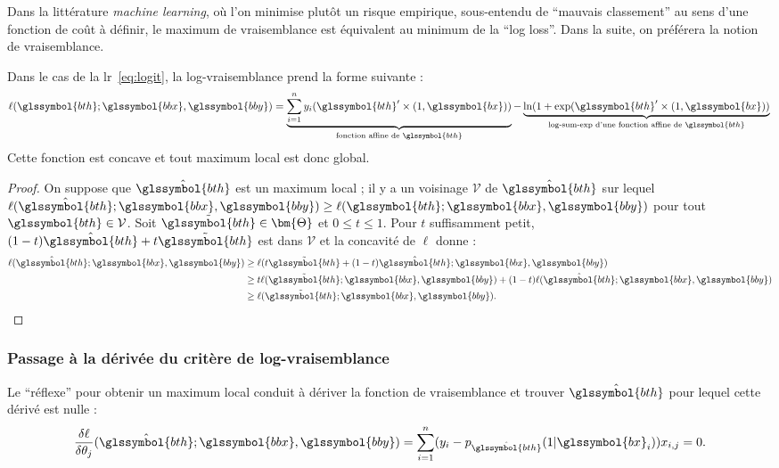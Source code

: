 Dans la littérature \textit{machine learning}, où l'on minimise plutôt un risque empirique, sous-entendu de ``mauvais classement'' au sens d'une fonction de coût à définir, le maximum de vraisemblance est équivalent au minimum de la ``log loss''. Dans la suite, on préférera la notion de vraisemblance.

Dans le cas de la \gls{lr}~\eqref{eq:logit}, la log-vraisemblance prend la forme suivante :
\[ \ell(\glssymbol{bth};\glssymbol{bbx},\glssymbol{bby}) = \underbrace{\sum_{i=1}^n y_i (\glssymbol{bth}' \times (1,\glssymbol{bx}))}_{\text{fonction affine de } \glssymbol{bth}} - \underbrace{\ln(1 + \exp(\glssymbol{bth}' \times (1,\glssymbol{bx}))}_{\text{log-sum-exp d'une fonction affine de } \glssymbol{bth}} \qedhere \]
Cette fonction est concave et tout maximum local est donc global. 
\begin{proof}
On suppose que $\hat{\glssymbol{bth}}$ est un maximum local ; il y a un voisinage $\mathcal{V}$ de $\hat{\glssymbol{bth}}$ sur lequel $\ell(\hat{\glssymbol{bth}};\glssymbol{bbx},\glssymbol{bby}) \geq \ell(\glssymbol{bth};\glssymbol{bbx},\glssymbol{bby})$ pour tout $\glssymbol{bth} \in \mathcal{V}$. Soit $\tilde{\glssymbol{bth}} \in \bm{\Theta}$ et $0 \leq t \leq 1$. Pour $t$ suffisamment petit, $(1-t)\hat{\glssymbol{bth}} + t \tilde{\glssymbol{bth}}$ est dans $\mathcal{V}$ et la concavité de $\ell$ donne :
\begin{align*}
\ell(\hat{\glssymbol{bth}};\glssymbol{bbx},\glssymbol{bby}) & \geq \ell(t \tilde{\glssymbol{bth}} + (1-t)\hat{\glssymbol{bth}};\glssymbol{bbx},\glssymbol{bby}) \\
& \geq t \ell(\tilde{\glssymbol{bth}};\glssymbol{bbx},\glssymbol{bby}) + (1-t) \ell(\hat{\glssymbol{bth}};\glssymbol{bbx},\glssymbol{bby}) \\
& \geq \ell(\tilde{\glssymbol{bth}};\glssymbol{bbx},\glssymbol{bby}).
\end{align*}
\end{proof}

\subsubsection{Passage à la dérivée du critère de log-vraisemblance}

Le ``réflexe'' pour obtenir un maximum local conduit à dériver la fonction de vraisemblance et trouver $\hat{\glssymbol{bth}}$ pour lequel cette dérivé est nulle :
\[ \dfrac{\delta \ell}{\delta \theta_j} (\hat{\glssymbol{bth}};\glssymbol{bbx},\glssymbol{bby})= \sum_{i=1}^n (y_i - p_{\hat{\glssymbol{bth}}}(1|\glssymbol{bx}_i)) x_{i,j} = 0.\]

